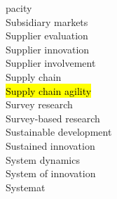 \documentclass[a4paper]{article}
\begin{document}
\begin{multicols*}{2}
\begin{footnotesize}
pacity \\ Subsidiary markets \\ Supplier evaluation \\ Supplier innovation \\ Supplier involvement \\ Supply chain \\ \hl{Supply chain agility} \\ Survey research \\ Survey-based research \\ Sustainable development \\ Sustained innovation \\ System dynamics \\ System of innovation \\ Systemat
\end{footnotesize}
\end{multicols*}
\end{document}
